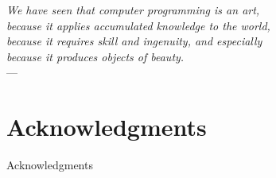 
\begin{flushright}{\slshape
        We have seen that computer programming is an art, \\
        because it applies accumulated knowledge to the world, \\
        because it requires skill and ingenuity, and especially \\
        because it produces objects of beauty.} \\ \medskip
    ---  \citep{knuth:1974}
\end{flushright}



\bigskip

\begingroup
\let\clearpage\relax
\let\cleardoublepage\relax
\let\cleardoublepage\relax
\chapter*{Acknowledgments}
Acknowledgments



\endgroup

